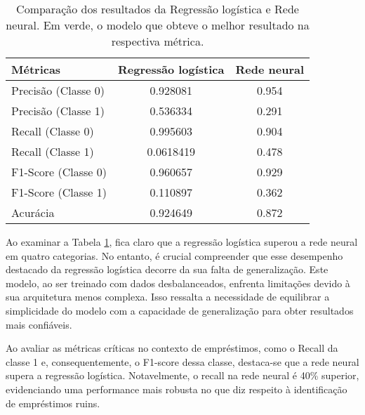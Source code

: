 \begin{table}[H]
  \centering
  \begin{tabular}{lcc}
    \hline
    \textbf{Métricas} & \textbf{Regressão logística} & \textbf{Rede neural} \\
    \hline
    Precisão (Classe 0) & 0.928081                     & \cellcolor{green!25}0.954 \\
    Precisão (Classe 1) & \cellcolor{green!25}0.536334 & 0.291 \\
    Recall   (Classe 0) & \cellcolor{green!25}0.995603 & 0.904 \\
    Recall   (Classe 1) & 0.0618419                    & \cellcolor{green!25}0.478 \\
    F1-Score (Classe 0) & \cellcolor{green!25} 0.960657  & 0.929 \\
    F1-Score (Classe 1) & 0.110897                     & \cellcolor{green!25}0.362 \\
    Acurácia            & \cellcolor{green!25}0.924649   & 0.872 \\
    \hline
  \end{tabular}
  \caption{Comparação dos resultados da Regressão logística e Rede neural. Em verde, o modelo que obteve o melhor resultado na respectiva métrica.}
  \label{tab:comparison_results}
\end{table}



Ao examinar a Tabela \ref{tab:comparison_results}, fica claro que a regressão logística superou a
rede neural em quatro categorias. No entanto, é crucial compreender que esse desempenho destacado
da regressão logística decorre da sua falta de generalização. Este modelo, ao ser treinado
com dados desbalanceados, enfrenta limitações devido à sua arquitetura menos complexa.
Isso ressalta a necessidade de equilibrar a simplicidade do modelo com a capacidade de
generalização para obter resultados mais confiáveis.


Ao avaliar as métricas críticas no contexto de empréstimos, como o Recall da classe 1 e, consequentemente, 
o F1-score dessa classe, destaca-se que a rede neural supera a regressão logística. Notavelmente, 
o recall na rede neural é 40\% superior, evidenciando uma performance mais robusta no que diz respeito 
à identificação de empréstimos ruins.



